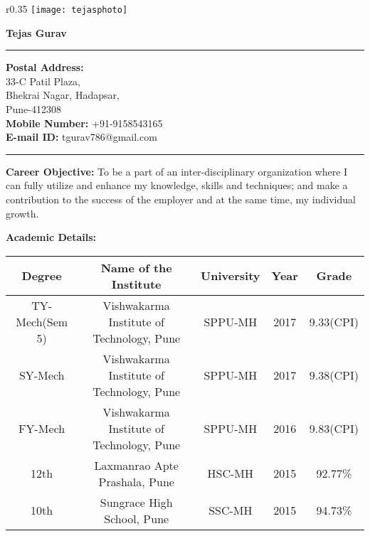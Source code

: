 \documentclass{article}
\begin{document}
	
	\begin{wrapfigure}{r}{0.35\textwidth}
		\centering
		\texttt{[image: tejasphoto]} 
	\end{wrapfigure}

	\begin{center}
		\Huge \textbf{Tejas Gurav}
	\end{center}

	\rule{450pt}{2pt}
	\begin{flushleft}
		\textbf{Postal Address:}\\
		33-C Patil Plaza,\\
		Bhekrai Nagar, Hadapsar,\\
		Pune-412308\\
		\textbf{Mobile Number:} +91-9158543165\\
		\textbf{E-mail ID:} tgurav786@gmail.com	
	\end{flushleft}	
	\rule{450pt}{2pt}
	\medskip
	\begin{flushleft}
		\textbf{Career Objective:} To be a part of an inter-disciplinary organization where I can fully utilize and enhance my knowledge, skills and techniques; and make a contribution to the success of the employer and at the same time, my individual growth.
		
		\medskip
		\textbf{Academic Details:} 
		\begin{center}
			\begin{tabular}{||c|c|c|c|c||} 
				\hline
				\textbf{Degree} & \textbf{Name of the Institute} & \textbf{University} & \textbf{Year} & \textbf{Grade} \\  
				\hline\hline
				TY-Mech(Sem 5) & Vishwakarma Institute of Technology, Pune & SPPU-MH & 2017 & 9.33(CPI)\\ 
				\hline
				SY-Mech & Vishwakarma Institute of Technology, Pune & SPPU-MH & 2017 & 9.38(CPI)\\ 
				\hline
				FY-Mech & Vishwakarma Institute of Technology, Pune & SPPU-MH & 2016 & 9.83(CPI)\\ 
				\hline
				12th & Laxmanrao Apte Prashala, Pune & HSC-MH & 2015 & 92.77\%\\ 
				\hline
				10th & Sungrace High School, Pune & SSC-MH & 2015 & 94.73\%\\   
				\hline
			\end{tabular}
		\end{center}
		
		
		
	\end{flushleft}
\end{document}

